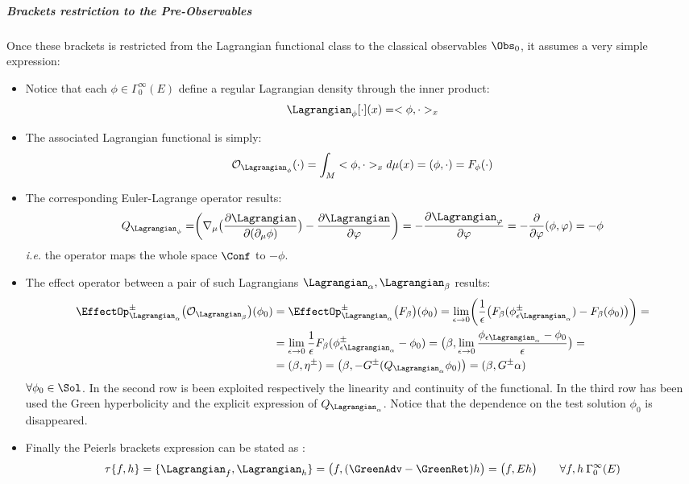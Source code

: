 \documentclass[Main]{subfiles}
\begin{document}
			\subparagraph{Brackets restriction to the Pre-Observables}
				Once these brackets is restricted from the Lagrangian functional class to the classical observables $\Obs_0$, it assumes a very simple expression:
				\begin{itemize}
					\item Notice that each $\phi \in \Gamma_0^\infty(E)$ define a regular Lagrangian density through the inner product:
						\begin{displaymath}
							\Lagrangian_\phi[\cdot](x) = <\phi, \cdot>_x
						\end{displaymath}
					\item The associated Lagrangian functional is simply:
						\begin{displaymath}
							\mathcal{O}_{\Lagrangian_\phi} (\cdot ) = \int_M  <\phi, \cdot>_x d\mu(x) = (\phi, \cdot) = F_\phi (\cdot)
						\end{displaymath}
					\item The corresponding Euler-Lagrange operator  results:
						\begin{displaymath}
							Q_{\Lagrangian_\phi}= \biggr( \nabla_\mu \big( \frac{\partial \Lagrangian}{\partial ( \partial_\mu \phi)} \big) - \frac{\partial \Lagrangian}{\partial \varphi} \biggr) = - \frac{\partial \Lagrangian_\varphi}{\partial \varphi} = -\frac{\partial}{\partial \varphi} (\phi, \varphi) = -\phi
						\end{displaymath}
						\textit{i.e.} the operator maps the whole space $\Conf$ to $-\phi$.
					\item The effect operator between a pair of such Lagrangians $\Lagrangian_\alpha, \Lagrangian_\beta$ results:
						\begin{align}
						\EffectOp_{\Lagrangian_\alpha}^\pm \big( \mathcal{O}_{\Lagrangian_\beta} \big) (\phi_0) &= \EffectOp_{\Lagrangian_\alpha}^\pm \big( F_\beta  \big) (\phi_0) = \lim_{\epsilon \rightarrow 0} \biggr( \frac{1}{\epsilon}\big(F_\beta ( \phi_{\epsilon \Lagrangian_\alpha}^\pm) - F_\beta(\phi_0) \big) \biggr) =\\
							&= \lim_{\epsilon \rightarrow 0} \frac{1}{\epsilon}F_\beta( \phi_{\epsilon \Lagrangian_\alpha}^\pm - \phi_0) = 
							\big(\beta, \lim_{\epsilon\rightarrow 0} \frac{ \phi_{\epsilon \Lagrangian_\alpha}  - \phi_0}{\epsilon} \big) = \\
							&=(\beta, \eta^\pm) = \big( \beta, - G^\pm (Q_{\Lagrangian_\alpha} \phi_0 ) \big) = ( \beta, G^\pm \alpha)
						\end{align}
						 $\forall 	\phi_0\in \Sol$.
						 In the second row is been exploited respectively the linearity and continuity of the functional.
						 In the third row has been used the Green hyperbolicity and the explicit expression of $Q_{\Lagrangian_\alpha}$.
						 Notice that the dependence on the test solution $\phi_0$ is disappeared.
					\item Finally the Peierls brackets expression can be stated as :
						\begin{equation}\label{Def:SymplecticTau}
							\tau\{f,h\} = \{\Lagrangian_f , \Lagrangian_h\} = \big( f , (\GreenAdv - \GreenRet)h \big) = \big(f, E h\big) \qquad \forall f,h \: \Gamma_0^\infty (E)
						\end{equation}
				\end{itemize}
\end{document}
